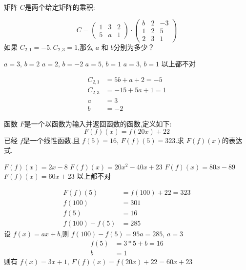 \documentclass[answers]{exam}
\begin{document}
\begin{questions}
	\question 矩阵 \( C \)是两个给定矩阵的乘积:

	\begin{equation*}
		C =
		\begin{pmatrix}
			1 & 3 & 2 \\
			5 & a & 1
		\end{pmatrix} \cdot
		\begin{pmatrix}
			b & 2 & -3 \\
			1 & 2 & 5  \\
			2 & 3 & 1
		\end{pmatrix}
	\end{equation*}
	如果 \( C_{2,1} = -5, C_{2,3} = 1 \),那么 \( a \) 和 \( b \)分别为多少？

	\begin{oneparchoices}
		\choice \( a = 3,\, b = 2 \)
		\choice \( a = 2,\, b = -2 \)
		\choice \( a = 5,\, b = 1 \)
		\choice \( a = 3,\, b = 1 \)
		\CorrectChoice 以上都不对
	\end{oneparchoices}

	\begin{solution}
		\begin{align*}
			C_{2,1} & = 5b + a + 2 = -5  \\
			C_{2,3} & = -15 + 5a + 1 = 1 \\
			a       & = 3                \\
			b       & = -2
		\end{align*}
	\end{solution}

	\question 函数 \( F \)是一个以函数为输入并返回函数的函数,定义如下:
	\begin{equation*}
		F(f)(x) = f(20x) + 22
	\end{equation*}
	已经 \( f \)是一个线性函数,且 \( f(5) = 16,\, F(f)(5) = 323 \).求 \( F(f)(x) \)的表达式.

	\begin{choices}
		\choice \( F(f)(x) = 2x - 8 \)
		\choice \( F(f)(x) = 20x^2 -40x + 23 \)
		\choice \( F(f)(x) = 80x - 89 \)
		\CorrectChoice \( F(f)(x) = 60x + 23 \)
		\choice 以上都不对
	\end{choices}

	\begin{solution}
		\begin{align*}
			F(f)(5)       & = f(100) + 22  = 323 \\
			f(100)        & = 301                \\
			f(5)          & = 16                 \\
			f(100) - f(5) & = 285
		\end{align*}
		设 \( f(x) = ax + b \),则 \( f(100) - f(5) = 95a = 285\), \( a =3 \)
		\begin{align*}
			f(5) & = 3 * 5 + b  = 16 \\
			b    & = 1
		\end{align*}
		则有 \( f(x) = 3x + 1 \), \( F(f)(x) = f(20x) + 22 = 60x + 23\)
	\end{solution}


\end{questions}
\end{document}
